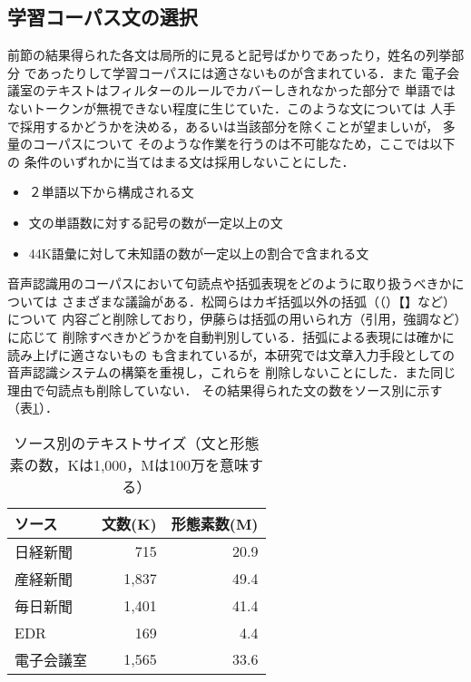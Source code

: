 \subsection{学習コーパス文の選択}
  前節の結果得られた各文は局所的に見ると記号ばかりであったり，姓名の列挙部分
であったりして学習コーパスには適さないものが含まれている．また
電子会議室のテキストはフィルターのルールでカバーしきれなかった部分で
単語ではないトークンが無視できない程度に生じていた．このような文については
人手で採用するかどうかを決める，あるいは当該部分を除くことが望ましいが，
多量のコーパスについて
そのような作業を行うのは不可能なため，ここでは以下の
条件のいずれかに当てはまる文は採用しないことにした．
\begin{itemize}
  \item ２単語以下から構成される文
  \item 文の単語数に対する記号の数が一定以上の文
  \item 44K語彙に対して未知語の数が一定以上の割合で含まれる文
\end{itemize}
音声認識用のコーパスにおいて句読点や括弧表現をどのように取り扱うべきかについては
さまざまな議論がある．松岡ら\cite{MATSUOKA}はカギ括弧以外の括弧（（）【】など）について
内容ごと削除しており，伊藤ら\cite{ITOHK}は括弧の用いられ方（引用，強調など）に応じて
削除すべきかどうかを自動判別している．括弧による表現には確かに読み上げに適さないもの
も含まれているが，本研究では文章入力手段としての音声認識システムの構築を重視し，これらを
削除しないことにした．また同じ理由で句読点も削除していない．
その結果得られた文の数をソース別に示す（表\ref{TBL:SOURCE}）．
\begin{table}[htb]
  \caption{ソース別のテキストサイズ（文と形態素の数，Kは1,000，Mは100万を意味する）}
  \label{TBL:SOURCE}
  \begin{center}
  \begin{tabular}{lrr}  \hline
     ソース   & 文数(K)  & 形態素数(M) \\ \hline
     日経新聞 & 715    & 20.9  \\
     産経新聞 & 1,837  & 49.4  \\
     毎日新聞 & 1,401  & 41.4  \\
     EDR      & 169 &  4.4  \\
     電子会議室   & 1,565  & 33.6  \\ \hline
  \end{tabular}
  \end{center}
\end{table}
